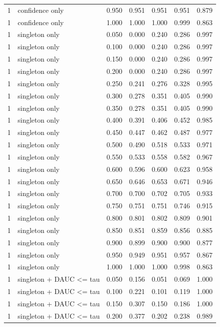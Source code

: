 \begin{tabular}{rlrrrrr}
1 & confidence only & 0.950 & 0.951 & 0.951 & 0.951 & 0.879 \\
1 & confidence only & 1.000 & 1.000 & 1.000 & 0.999 & 0.863 \\
1 & singleton only & 0.050 & 0.000 & 0.240 & 0.286 & 0.997 \\
1 & singleton only & 0.100 & 0.000 & 0.240 & 0.286 & 0.997 \\
1 & singleton only & 0.150 & 0.000 & 0.240 & 0.286 & 0.997 \\
1 & singleton only & 0.200 & 0.000 & 0.240 & 0.286 & 0.997 \\
1 & singleton only & 0.250 & 0.241 & 0.276 & 0.328 & 0.995 \\
1 & singleton only & 0.300 & 0.278 & 0.351 & 0.405 & 0.990 \\
1 & singleton only & 0.350 & 0.278 & 0.351 & 0.405 & 0.990 \\
1 & singleton only & 0.400 & 0.391 & 0.406 & 0.452 & 0.985 \\
1 & singleton only & 0.450 & 0.447 & 0.462 & 0.487 & 0.977 \\
1 & singleton only & 0.500 & 0.490 & 0.518 & 0.533 & 0.971 \\
1 & singleton only & 0.550 & 0.533 & 0.558 & 0.582 & 0.967 \\
1 & singleton only & 0.600 & 0.596 & 0.600 & 0.623 & 0.958 \\
1 & singleton only & 0.650 & 0.646 & 0.653 & 0.671 & 0.946 \\
1 & singleton only & 0.700 & 0.700 & 0.702 & 0.705 & 0.933 \\
1 & singleton only & 0.750 & 0.751 & 0.751 & 0.746 & 0.915 \\
1 & singleton only & 0.800 & 0.801 & 0.802 & 0.809 & 0.901 \\
1 & singleton only & 0.850 & 0.851 & 0.859 & 0.856 & 0.885 \\
1 & singleton only & 0.900 & 0.899 & 0.900 & 0.900 & 0.877 \\
1 & singleton only & 0.950 & 0.949 & 0.951 & 0.957 & 0.867 \\
1 & singleton only & 1.000 & 1.000 & 1.000 & 0.998 & 0.863 \\
1 & singleton + DAUC <= tau & 0.050 & 0.156 & 0.051 & 0.069 & 1.000 \\
1 & singleton + DAUC <= tau & 0.100 & 0.221 & 0.101 & 0.119 & 1.000 \\
1 & singleton + DAUC <= tau & 0.150 & 0.307 & 0.150 & 0.186 & 1.000 \\
1 & singleton + DAUC <= tau & 0.200 & 0.377 & 0.202 & 0.238 & 0.989 \\

\end{tabular}
